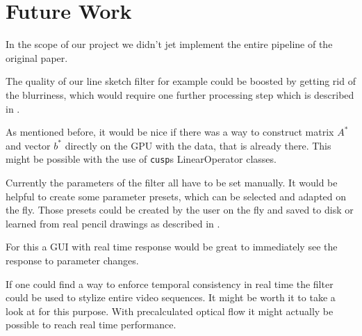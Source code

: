 \section{Future Work} \label{future-work}
In the scope of our project we didn't jet implement the entire pipeline of the
original paper. 

The quality of our line sketch filter for example could be boosted by getting
rid of the blurriness, which would require one further processing step which is
described in \cite{mainPaper}.

As mentioned before, it would be nice if there was a way to construct matrix
$A^*$ and vector $b^*$ directly on the GPU with the data, that is already
there. This might be possible with the use of \texttt{cusp}s LinearOperator
classes.

Currently the parameters of the filter all have to be set manually. It would be
helpful to create some parameter presets, which can be selected and adapted on
the fly. Those presets could be created by the user on the fly and saved to disk
or learned from real pencil drawings as described in \cite{mainPaper}.

For this a GUI with real time response would be great to immediately see the
response to parameter changes. 

If one could find a way to enforce temporal consistency in real time the filter
could be used to stylize entire video sequences. It might be worth it to take a
look at \cite{temporal-consistency} for this purpose. With precalculated optical
flow it might actually be possible to reach real time performance.
